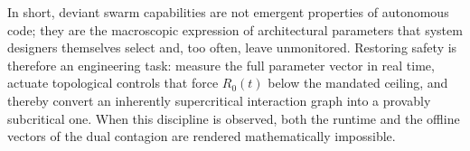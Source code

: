 In short, deviant swarm capabilities are not emergent properties of autonomous code; they are the macroscopic expression of architectural parameters that system designers themselves select and, too often, leave unmonitored. Restoring safety is therefore an engineering task: measure the full parameter vector in real time, actuate topological controls that force \(R_0(t)\) below the mandated ceiling, and thereby convert an inherently supercritical interaction graph into a provably subcritical one. When this discipline is observed, both the runtime and the offline vectors of the dual contagion are rendered mathematically impossible.
